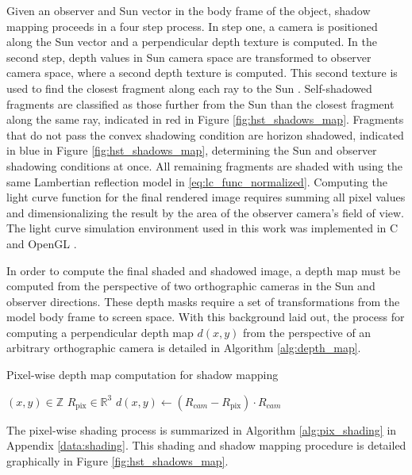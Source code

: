 Given an observer and Sun vector in the body frame of the object, shadow mapping proceeds in a four step process. In step one, a camera is positioned along the Sun vector and a perpendicular depth texture is computed. In the second step, depth values in Sun camera space are transformed to observer camera space, where a second depth texture is computed. This second texture is used to find the closest fragment along each ray to the Sun \cite{brabec2002}. Self-shadowed fragments are classified as those further from the Sun than the closest fragment along the same ray, indicated in red in Figure \ref{fig:hst_shadows_map}. Fragments that do not pass the convex shadowing condition are horizon shadowed, indicated in blue in Figure \ref{fig:hst_shadows_map}, determining the Sun and observer shadowing conditions at once. All remaining fragments are shaded with using the same Lambertian reflection model in \ref{eq:lc_func_normalized}. Computing the light curve function for the final rendered image requires summing all pixel values and dimensionalizing the result by the area of the observer camera's field of view. The light curve simulation environment used in this work was implemented in C and OpenGL \cite{raylib}.

In order to compute the final shaded and shadowed image, a depth map must be computed from the perspective of two orthographic cameras in the Sun and observer directions. These depth masks require a set of transformations from the model body frame to screen space. With this background laid out, the process for computing a perpendicular depth map $d(x,y)$ from the perspective of an arbitrary orthographic camera is detailed in Algorithm \ref{alg:depth_map}.

\begin{algorithm}
  \caption{Pixel-wise depth map computation for shadow mapping} \label{alg:depth_map}
  \begin{algorithmic}
    \State $(x, y) \in \mathbb{Z}$ 
    \State $R_\mathrm{pix} \in \mathbb{R}^3$ 
    \State $d(x, y) \gets \left( R_{cam} - R_\mathrm{pix} \right) \cdot R_{cam}$ 
  \end{algorithmic}
\end{algorithm}

The pixel-wise shading process is summarized in Algorithm \ref{alg:pix_shading} in Appendix \ref{data:shading}. This shading and shadow mapping procedure is detailed graphically in Figure \ref{fig:hst_shadows_map}.

